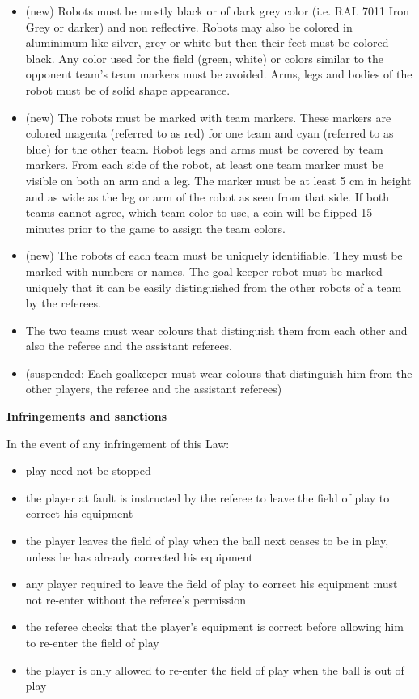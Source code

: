 \begin{itemize}
\item (new) Robots must be mostly black or of dark grey color (i.e. RAL 7011 Iron Grey or darker) and non reflective. Robots may also be colored in aluminimum-like silver, grey or white but then their feet must be colored black. Any color used for the field (green, white) or colors similar to the opponent team's team markers must be avoided. Arms, legs and bodies of the robot must be of solid shape appearance.
\item (new) The robots must be marked with team markers. These markers are colored magenta (referred to as red) for one team and cyan (referred to as blue) for the other team. Robot legs and arms must be covered by team markers. From each side of the robot, at least one team marker must be visible on both an arm and a leg. The marker must be at least 5 cm in height and as wide as the leg or arm of the robot as seen from that side. If both teams cannot agree, which team color to use, a coin will be flipped 15 minutes prior to the game to assign the team colors.
\item (new) The robots of each team must be uniquely identifiable. They must be marked with numbers or names. The goal keeper robot must be marked uniquely that it can be easily distinguished from the other robots of a team by the referees. 
\item The two teams must wear colours that distinguish them from each other and also the referee and the assistant referees.
\item {\color[rgb]{0.4,0.4,0.4}
(suspended: Each goalkeeper must wear colours that distinguish him from the other players, the referee and the assistant referees) }
\end{itemize}

\bigskip

{\bfseries Infringements and sanctions}

\headlinebox

In the event of any infringement of this Law:

\begin{itemize}
\item play need not be stopped
\item the player at fault is instructed by the referee to leave the field of play to correct his equipment
\item the player leaves the field of play when the ball next ceases to be in play, unless he has already corrected his equipment
\item any player required to leave the field of play to correct his equipment must not re-enter without the referee's permission
\item the referee checks that the player{\textquoteright}s equipment is correct before allowing him to re-enter the field of play 
\item the player is only allowed to re-enter the field of play when the ball is out of play
\end{itemize}


